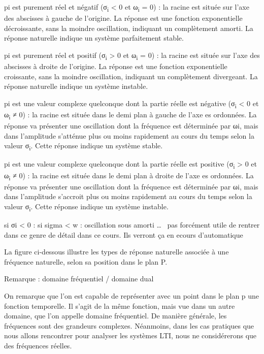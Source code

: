 \documentclass[]{article}
\begin{document}
pi est purement réel et négatif (σ\textsubscript{i} \textless{} 0 et
ω\textsubscript{i} = 0) : la racine est située sur l'axe des abscisses à
gauche de l'origine. La réponse est une fonction exponentielle
décroissante, sans la moindre oscillation, indiquant un complètement
amorti. La réponse naturelle indique un système parfaitement stable.

pi est purement réel et positif (σ\textsubscript{i} \textgreater{} 0 et
ω\textsubscript{i} = 0) : la racine est située sur l'axe des abscisses à
droite de l'origine. La réponse est une fonction exponentielle
croissante, sans la moindre oscillation, indiquant un complètement
divergeant. La réponse naturelle indique un système instable.

pi est une valeur complexe quelconque dont la partie réelle est négative
(σ\textsubscript{i} \textless{} 0 et ω\textsubscript{i} ≠ 0) : la racine
est située dans le demi plan à gauche de l'axe es ordonnées. La réponse
va présenter une oscillation dont la fréquence est déterminée par ωi,
mais dans l'amplitude s'atténue plus ou moins rapidement au cours du
temps selon la valeur σ\textsubscript{i}. Cette réponse indique un
système stable.

pi est une valeur complexe quelconque dont la partie réelle est positive
(σ\textsubscript{i} \textgreater{} 0 et ω\textsubscript{i} ≠ 0) : la
racine est située dans le demi plan à droite de l'axe es ordonnées. La
réponse va présenter une oscillation dont la fréquence est déterminée
par ωi, mais dans l'amplitude s'accroit plus ou moins rapidement au
cours du temps selon la valeur σ\textsubscript{i}. Cette réponse indique
un système instable.

si σi \textless{} 0 : si sigma \textless{} w : oscillation sous amorti
\ldots{}~ pas forcément utile de rentrer dans ce genre de détail dans ce
cours. Ils verront ça en ecours d'automatique

La figure ci-dessous illustre les types de réponse naturelle associée à
une fréquence naturelle, selon sa position dans le plan P.

Remarque : domaine fréquentiel / domaine dual

On remarque que l'on est capable de représenter avec un point dans le
plan p une fonction temporelle. Il s'agit de la même fonction, mais vue
dans un autre domaine, que l'on appelle domaine fréquentiel. De manière
générale, les fréquences sont des grandeurs complexes. Néanmoins, dans
les cas pratiques que nous allons rencontrer pour analyser les systèmes
LTI, nous ne considérerons que des fréquences réelles.
\end{document}
